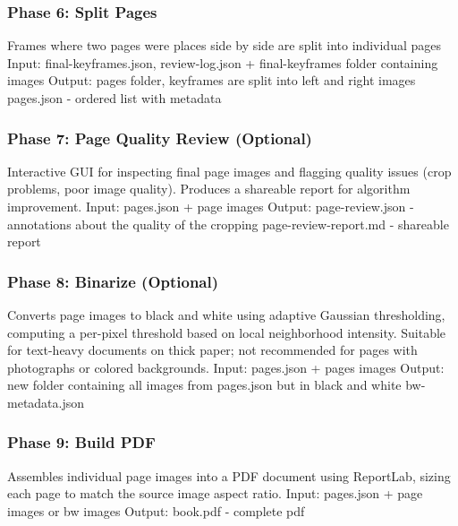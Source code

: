 \subsubsection{Phase 6: Split Pages}
Frames where two pages were places side by side are split into individual pages
Input: final-keyframes.json, review-log.json + final-keyframes folder containing images
Output: pages folder, keyframes are split into left and right images
pages.json - ordered list with metadata

\subsubsection{Phase 7: Page Quality Review (Optional)}
Interactive GUI for inspecting final page images and flagging quality issues (crop problems, poor image quality). Produces a shareable report for algorithm improvement.
Input: pages.json + page images
Output: page-review.json - annotations about the quality of the cropping
page-review-report.md - shareable report

\subsubsection{Phase 8: Binarize (Optional)}
Converts page images to black and white using adaptive Gaussian thresholding, computing a per-pixel threshold based on local neighborhood intensity. Suitable for text-heavy documents on thick paper; not recommended for pages with photographs or colored backgrounds.
Input: pages.json + pages images
Output: new folder containing all images from pages.json but in black and white
bw-metadata.json

\subsubsection{Phase 9: Build PDF}
Assembles individual page images into a PDF document using ReportLab, sizing each page to match the source image aspect ratio.
Input: pages.json + page images or bw images
Output: book.pdf - complete pdf
